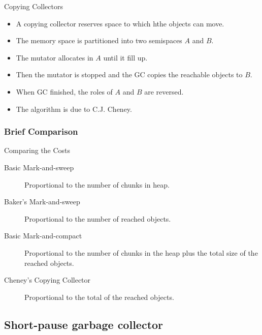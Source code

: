 \begin{bibunit}[apalike]
\begin{frame}{Copying Collectors}
	\begin{itemize}
	\item A copying collector reserves space to which hthe objects can move.
	\item The memory space is partitioned into two semispaces $A$ and $B$.
	\item The mutator allocates in $A$ until it fill up.
	\item Then the mutator is stopped and the GC copies the reachable objects to $B$.
	\item When GC finished, the roles of $A$ and $B$ are reversed.
	\vfill
	\item The algorithm is due to C.J. Cheney.
	\end{itemize}
\end{frame}

\subsubsection{Brief Comparison}

\tableofcontentslide[sections={4-6},sectionstyle={show/shaded},subsectionstyle={show/shaded/hide},subsubsectionstyle={show/shaded/hide/hide}]

\begin{frame}{Comparing the Costs}
	\begin{description}
	\item[Basic Mark-and-sweep] Proportional to the number of chunks in heap.
	\vfill
	\item[Baker's Mark-and-sweep] Proportional to the number of reached objects.
	\vfill
	\item[Basic Mark-and-compact] Proportional to the number of chunks in the heap plus the total size of the reached objects.
	\vfill
	\item[Cheney's Copying Collector] Proportional to the total of the reached objects.
	\end{description}
\end{frame}

\subsection{Short-pause garbage collector}

\tableofcontentslide[sections={4-6},sectionstyle={show/shaded},subsectionstyle={show/shaded/hide},subsubsectionstyle={show/show/hide/hide}]


\end{bibunit}

